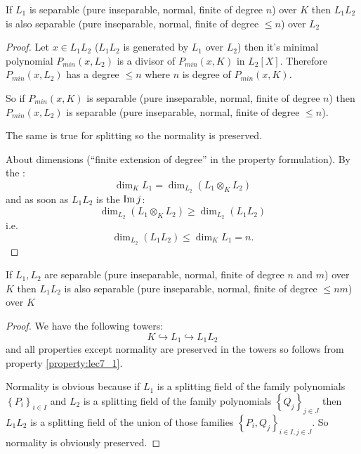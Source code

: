 \begin{property}
  If $L_1$ is separable (pure inseparable, normal, finite of
  degree $n$) over $K$ then $L_1 L_2$ is also separable (pure
  inseparable, normal, finite of degree $ \le n$) over $L_2$
  \begin{proof}
    Let $x \in L_1 L_2$ ($L_1 L_2$ is generated by $L_1$ over $L_2$)
    then it's minimal polynomial $P_{min}\left(x, L_2\right)$ is a
    divisor of $P_{min}\left(x, K\right)$ in
    $L_2\left[X\right]$. Therefore $P_{min}\left(x, L_2\right)$ has a
    degree $\le n$ where $n$ 
    is degree of $P_{min}\left(x, K\right)$.

    So if $P_{min}\left(x, K\right)$ is separable (pure inseparable,
    normal, finite of degree $n$)  then $P_{min}\left(x, L_2\right)$
    is separable (pure inseparable, normal, finite of degree $\le n$).

    The same is true for splitting so the normality is preserved.

    About dimensions (``finite extension of degree'' in the property
    formulation). By the :
    \[
    \dim_K L_1 = \dim_{L_2}\left(L_1 \otimes_K L_2\right)
    \]
    and as soon as $L_1 L_2$ is the $\operatorname{Im} j$:
    \[
    \dim_{L_2}\left(L_1 \otimes_K L_2\right) \ge
    \dim_{L_2}\left(L_1 L_2\right)
    \]
    i.e.
    \[
    \dim_{L_2}\left(L_1 L_2\right) \le \dim_K L_1 = n.
    \]
  \end{proof}
  \label{property:lec7_1}
\end{property}

\begin{property}
  If $L_1, L_2$ are separable (pure inseparable, normal, finite of
  degree $n$ and $m$) over $K$ then $L_1 L_2$ is also separable (pure
  inseparable, normal, finite of degree $ \le n m $) over $K$
  \begin{proof}
    We have the following towers:
    \[
    K \hookrightarrow L_1 \hookrightarrow L_1 L_2
    \]
    and all properties except normality are preserved in the towers so
    follows from property \ref{property:lec7_1}.

    Normality is obvious because if $L_1$ is a splitting field of the
    family polynomials $\left\{P_i\right\}_{i \in I}$
    and $L_2$ is a splitting field of the
    family polynomials $\left\{Q_j\right\}_{j \in J}$ then
    $L_1 L_2$ is a splitting field of the union of those families
    $\left\{P_i, Q_j\right\}_{i \in I, j \in J}$. So normality is
    obviously preserved.  
  \end{proof}
  \label{property:lec7_2}
\end{property}


